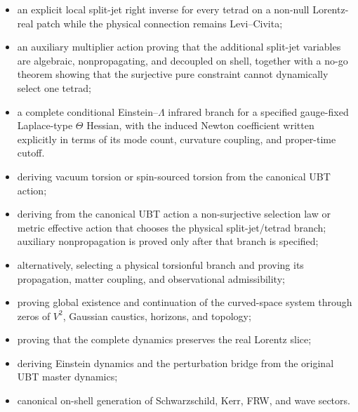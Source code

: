 \documentclass[12pt,a4paper]{article}
\theoremstyle{remark}\newtheorem{remark}[definition]{Remark}
\begin{document}
\begin{tcolorbox}[breakable,colback=green!5!white,colframe=green!60!black,title=Proved in this draft]
\begin{itemize}
       locally flat; affine stationarity for all coefficients is only the
       resulting Jacobian/null-Lagrangian corollary, not a curved-GR branch.
 \item an explicit local split-jet right inverse for every tetrad on a
       non-null Lorentz-real patch while the physical connection remains
       Levi--Civita;
 \item an auxiliary multiplier action proving that the additional split-jet
       variables are algebraic, nonpropagating, and decoupled on shell,
       together with a no-go theorem showing that the surjective pure
       constraint cannot dynamically select one tetrad;
 \item a complete conditional Einstein--$\Lambda$ infrared branch for a
       specified gauge-fixed Laplace-type $\Theta$ Hessian, with the induced
       Newton coefficient written explicitly in terms of its mode count,
       curvature coupling, and proper-time cutoff.
\end{itemize}
\end{tcolorbox}

\begin{tcolorbox}[breakable,colback=yellow!7!white,colframe=orange!70!black,title=Open]
\begin{itemize}
 \item deriving vacuum torsion or spin-sourced torsion from the canonical UBT
       action;
 \item deriving from the canonical UBT action a non-surjective selection law
       or metric effective action that chooses the physical split-jet/tetrad
       branch; auxiliary nonpropagation is proved only after that branch is
       specified;
 \item alternatively, selecting a physical torsionful branch and proving its
       propagation, matter coupling, and observational admissibility;
 \item proving global existence and continuation of the curved-space system
       through zeros of $V^2$, Gaussian caustics, horizons, and topology;
 \item proving that the complete dynamics preserves the real Lorentz slice;
 \item deriving Einstein dynamics and the perturbation bridge from the original
       UBT master dynamics;
 \item canonical on-shell generation of Schwarzschild, Kerr, FRW, and wave
       sectors.
\end{itemize}
\end{tcolorbox}
\end{document}
